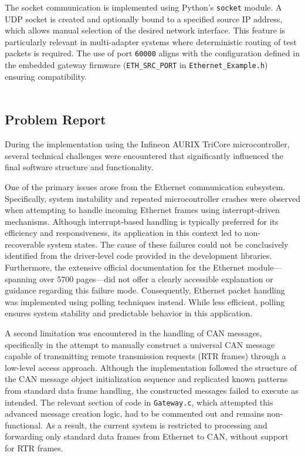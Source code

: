 The socket communication is implemented using Python's \verb|socket| module. A UDP socket is created and optionally bound to a specified source IP address, which allows manual selection of the desired network interface. This feature is particularly relevant in multi-adapter systems where deterministic routing of test packets is required. The use of port \verb|60000| aligns with the configuration defined in the embedded gateway firmware (\verb|ETH_SRC_PORT| in \verb|Ethernet_Example.h|) ensuring compatibility.\\\\

\subsection{Problem Report}

During the implementation using the Infineon AURIX TriCore microcontroller, several technical challenges were encountered that significantly influenced the final software structure and functionality.

One of the primary issues arose from the Ethernet communication subsystem. Specifically, system instability and repeated microcontroller crashes were observed when attempting to handle incoming Ethernet frames using interrupt-driven mechanisms. Although interrupt-based handling is typically preferred for its efficiency and responsiveness, its application in this context led to non-recoverable system states. The cause of these failures could not be conclusively identified from the driver-level code provided in the development libraries. Furthermore, the extensive official documentation for the Ethernet module—spanning over 5700 pages—did not offer a clearly accessible explanation or guidance regarding this failure mode. Consequently, Ethernet packet handling was implemented using polling techniques instead. While less efficient, polling ensures system stability and predictable behavior in this application.

A second limitation was encountered in the handling of CAN messages, specifically in the attempt to manually construct a universal CAN message capable of transmitting remote transmission requests (RTR frames) through a low-level access approach. Although the implementation followed the structure of the CAN message object initialization sequence and replicated known patterns from standard data frame handling, the constructed messages failed to execute as intended. The relevant section of code in \verb|Gateway.c|, which attempted this advanced message creation logic, had to be commented out and remains non-functional. As a result, the current system is restricted to processing and forwarding only standard data frames from Ethernet to CAN, without support for RTR frames.

